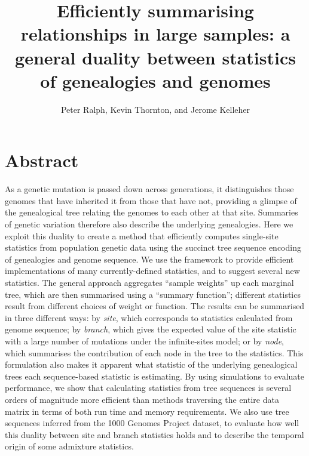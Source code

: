 \documentclass{article}
\begin{document}
\title{
    Efficiently summarising relationships in large samples:
    a general duality between statistics of genealogies and genomes}
\author{Peter Ralph, Kevin Thornton, and Jerome Kelleher}
\maketitle



\section*{Abstract}

As a genetic mutation is passed down across generations,
it distinguishes those genomes that have inherited it from those that have not,
providing a glimpse of the genealogical tree relating the genomes to each other at that site.
Summaries of genetic variation therefore also describe the underlying genealogies.
Here we exploit this duality to create a method that efficiently computes single-site statistics
from population genetic data using the succinct tree sequence encoding
of genealogies and genome sequence.
We use the framework to provide efficient implementations of
many currently-defined statistics, and to suggest several new statistics.
The general approach aggregates ``sample weights'' up each marginal tree,
which are then summarised using a ``summary function'';
different statistics result from different choices of weight or function.
The results can be summarised in three different ways:
by \emph{site}, which corresponds to statistics calculated from genome
sequence;
by \emph{branch}, which gives the expected value of the site statistic
with a large number of mutations under the infinite-sites model;
or by \emph{node}, which summarises the contribution of each node in the tree to the statistics.
This formulation also makes it apparent what statistic of the underlying genealogical trees
each sequence-based statistic is estimating.  By using simulations to evaluate performance, we
show that calculating statistics from tree sequences is several orders of magnitude more efficient than
methods traversing the entire data matrix in terms of both run time and memory requirements.
We also use tree sequences inferred from the 1000 Genomes Project dataset,
to evaluate how well this duality between site and branch statistics holds
and to describe the temporal origin of some admixture statistics.
\end{document}
